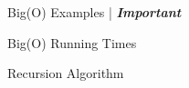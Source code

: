 \documentclass[12pt,a4paper]{article}
\begin{document}
    \begin{figure}[!hbtp]
        \centering
        \caption{Big(O) Examples | \textbf{\emph{Important}}}
    \end{figure}

    \begin{figure}[!hbtp]
        \centering
        \caption{Big(O) Running Times}
    \end{figure}

    \begin{figure}[!hbtp]
        \centering
        \caption{Recursion Algorithm}
    \end{figure}
\end{document}
